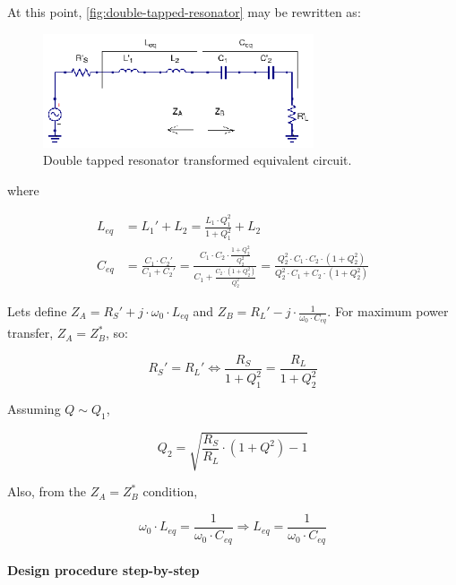 \noindent At this point, \ref{fig:double-tapped-resonator} may be rewritten as:

\begin{figure}[H]
\centering
\includegraphics[width=80mm]{Double-Tapped-Resonator-Transformed}
\caption{Double tapped resonator transformed equivalent circuit.}
\label{fig:double-tapped-resonator-transformed}
\end{figure}

\noindent where

\begin{align}
  L_{eq} &= L_1' + L_2 = \frac{L_1 \cdot Q_1^2}{1 + Q_1^2} + L_2\\
  C_{eq} &= \frac{C_1 \cdot C_2'}{C_1 + C_2'} = \frac{C_1 \cdot C_2 \cdot \frac{1 + Q_2^2}{Q_2^2}}{C_1 + \frac{C_2 \cdot (1 + Q_2^2)}{Q_2^2}} = \frac{Q_2^2 \cdot C_1 \cdot C_2 \cdot (1 + Q_2^2)}{Q_2^2 \cdot C_1 + C_2 \cdot (1 + Q_2^2)}
\end{align}

\noindent Lets define $Z_A = R_S' + j \cdot \omega_0 \cdot L_{eq}$ and $Z_B = R_L' - j \cdot \frac{1}{\omega_0 \cdot C_{eq}}$. For maximum power transfer, $Z_A = Z_B^*$, so:

\begin{equation}
R_S' = R_L' \Longleftrightarrow   \frac{R_S}{1 + Q_1^2} = \frac{R_L}{1 + Q_2^2}
\end{equation}

\noindent Assuming $Q \sim Q_1$,

\begin{equation}
Q_2 = \sqrt{\frac{R_S}{R_L} \cdot \left(1 + Q^2\right) - 1}
\end{equation}

\noindent Also, from the $Z_A = Z_B^*$ condition,

\begin{equation}
\omega_0 \cdot L_{eq} = \frac{1}{\omega_0 \cdot C_{eq}} \Longrightarrow L_{eq} = \frac{1}{\omega_0 \cdot C_{eq}} 
\end{equation}

\paragraph{Design procedure step-by-step}

